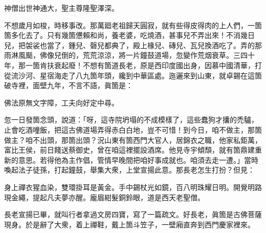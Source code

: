 \begin{myquote}
神僧出世神通大，聖主尊隆聖澤深。
\end{myquote}

不想歲月如梭，時移事改。那萬廻老祖歸天圓寂，就有些得皮得肉的上人們，一箇箇多化去了。只有幾箇憊賴和尚，養老婆，吃燒酒，{}甚事兒不弄出來！不消幾日兒，把袈裟也當了，鍾兒、磬兒都典了，殿上椽兒、磚兒、瓦兒換酒吃了。弄的那雨淋風颳，佛像兒倒的，荒荒涼涼，將一片鐘鼓道場，忽變作荒烟衰草。三四十年，那一箇肯扶衰起廢！不想有箇道長老，原是西印度國出身，因慕中國清華，打從流沙河、星宿海走了八九箇年頭，纔到中華區處。迤邐來到山東，就卓錫在這箇破寺裡，面壁九年，不言不語，{}眞箇是：

\begin{myquote}
佛法原無文字障，工夫向好定中尋。
\end{myquote}

忽一日發箇念頭，說道：「呀，這寺院坍塌的不成模樣了，這些蠢狗才攮的禿驢，止會吃酒噇飯，把這古佛道場弄得赤白白地，豈不可惜！到今日，咱不做主，那箇做主？咱不出頭，那箇出頭？況山東有箇西門大官人，居錦衣之職，他家私鉅萬，富比王侯，前日餞送蔡御史，曾在咱這裡擺設酒席。他見寺宇傾頹，就有箇鼎建重新的意思。若得他為主作倡，管情早晚間把咱好事成就也。咱須去走一遭。」當時喚起法子徒孫，打起鐘鼓，舉集大衆，上堂宣揚此意。那長老怎生打扮？但見：

\begin{myquote}
身上禪衣猩血染，雙環掛耳是黃金。手中錫杖光如鏡，百八明珠耀日明。開覺明路現金繩，提起凡夫夢亦醒。龐眉紺髮銅鈴眼，道是西天老聖僧。
\end{myquote}

長老宣揚已畢，就叫行者拿過文房四寶，寫了一篇疏文。好長老，眞箇是古佛菩薩現身。於是辭了大衆，着上禪鞋，戴上箇斗笠子，一壁廂直奔到西門慶家裡來。

